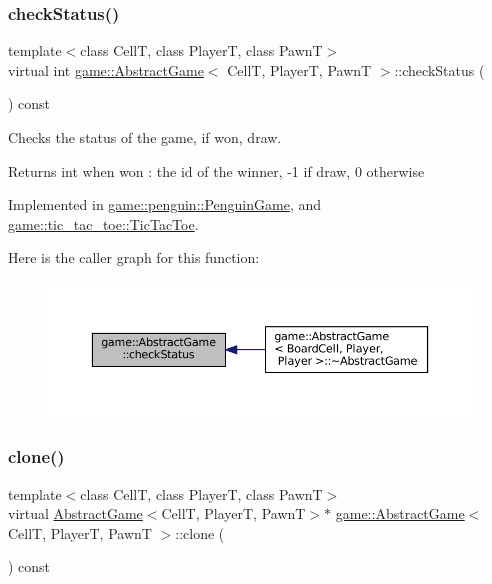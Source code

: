 \subsubsection{\texorpdfstring{check\+Status()}{checkStatus()}}
{\footnotesize\ttfamily template$<$class CellT, class PlayerT, class PawnT$>$ \\
virtual int \hyperlink{classgame_1_1_abstract_game}{game\+::\+Abstract\+Game}$<$ CellT, PlayerT, PawnT $>$\+::check\+Status (\begin{DoxyParamCaption}{ }\end{DoxyParamCaption}) const\hspace{0.3cm}{\ttfamily [pure virtual]}}



Checks the status of the game, if won, draw. 

\begin{DoxyReturn}{Returns}
int when won \+: the id of the winner, -\/1 if draw, 0 otherwise 
\end{DoxyReturn}


Implemented in \hyperlink{classgame_1_1penguin_1_1_penguin_game_af255dc5b05ef5244ac864d4aa2d3be2e}{game\+::penguin\+::\+Penguin\+Game}, and \hyperlink{classgame_1_1tic__tac__toe_1_1_tic_tac_toe_a033d73237ae31a39c23a0e887adbce2f}{game\+::tic\+\_\+tac\+\_\+toe\+::\+Tic\+Tac\+Toe}.

Here is the caller graph for this function\+:
\nopagebreak
\begin{figure}[H]
\begin{center}
\leavevmode
\includegraphics[width=350pt]{classgame_1_1_abstract_game_a3683d4f37908f769a470af6ebf73d849_icgraph}
\end{center}
\end{figure}
\mbox{\label{classgame_1_1_abstract_game_a226baac1f32a8f6672d922675ffddbf6}} 
\subsubsection{\texorpdfstring{clone()}{clone()}}
{\footnotesize\ttfamily template$<$class CellT, class PlayerT, class PawnT$>$ \\
virtual \hyperlink{classgame_1_1_abstract_game}{Abstract\+Game}$<$CellT, PlayerT, PawnT$>$$\ast$ \hyperlink{classgame_1_1_abstract_game}{game\+::\+Abstract\+Game}$<$ CellT, PlayerT, PawnT $>$\+::clone (\begin{DoxyParamCaption}{ }\end{DoxyParamCaption}) const\hspace{0.3cm}{\ttfamily [pure virtual]}}



